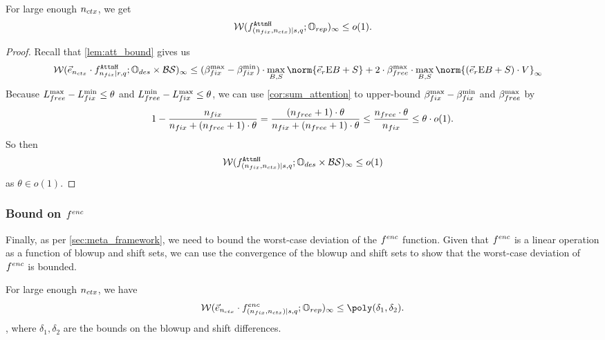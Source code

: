 \begin{lemma}
	\label{lem:convgattn}
	For large enough ${n_{ctx}}$, we get
	\[
		\mathcal{W}(f^{\texttt{AttnH}}_{(n_{fix}, {n_{ctx}}) \mid {s}, q}; \mathbb{O}_{rep})_\infty \leq o(1).
	\]
\end{lemma}
\begin{proof}
	\label{proof:convgattn}
	Recall that \cref{lem:att_bound} gives us
	\begin{align*}
		&\WD(\vecNctx \cdot f^{\attnH}_{\ndes \mid r, q} ; \InpSpace \times \blowupSet \shiftSet)_\infty  
						 \leq					   (\ssMaxRB - \ssMinRB) \cdot \max_{B, S}\norm{\vecDes \Embed B + S} + 
											   2 \cdot \ssMaxFB \cdot \max_{B, S}\norm{(\vecDes \Embed B + S) \cdot V}_\infty
	\end{align*}
	Because $L_{free}^{\max} - L_{fix}^{\min} \leq \theta$ and $L_{free}^{\min} - L_{fix}^{\max} \leq \theta$,
	we can use \cref{cor:sum_attention} to upper-bound ${\beta}_{fix}^{\max} - {\beta}_{fix}^{\min}$ and ${\beta}_{free}^{\max}$ by
	\begin{align*}
		1 - \frac{n_{fix}}{n_{fix} + (n_{free} + 1) \cdot \theta}
		= \frac{(n_{free} + 1) \cdot \theta}{n_{fix} + (n_{free} + 1) \cdot \theta} 
		\leq \frac{n_{free} \cdot \theta}{n_{fix}} 
		\leq \theta \cdot o(1).
	\end{align*}
	So then
	\[
		\mathcal{W}(f^{\texttt{AttnH}}_{(n_{fix}, {n_{ctx}}) \mid {s}, q} ; \mathbb{O}_{des} \times \mathcal{B} \mathcal{S})_\infty \leq 
		o(1) 
	\]
	as $\theta \in o(1)$.
\end{proof}

\subsubsection*{Bound on $f^{enc}$}
Finally, as per \cref{sec:meta_framework}, we need to bound the worst-case deviation of the $f^{enc}$ function.
Given that $f^{enc}$ is a linear operation as a function of blowup and shift sets, we can use the convergence of the blowup and shift sets to show that the worst-case deviation of $f^{enc}$ is bounded.

\begin{lemma}
	\label{lem:conv_fenc_bound}
	For large enough ${n_{ctx}}$, we have
	\[
		\WD(\vec{e}_\nctx \cdot \desF{\fenc}; \RepSpace)_\infty \leq \poly(\delta_1, \delta_2).
	\],
    where $\delta_1, \delta_2$ are the bounds on the blowup and shift differences.
\end{lemma}

